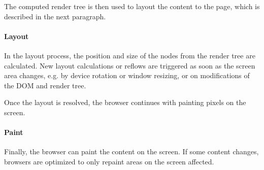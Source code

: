 The computed render tree is then used to layout the content to the page, which is described in the next paragraph.








\paragraph{Layout}



In the layout process, the position and size of the nodes from the render tree are calculated.
New layout calculations or reflows are triggered as soon as the screen area changes, e.g. by device rotation or window resizing, or on modifications of the DOM and render tree. %

Once the layout is resolved, the browser continues with painting pixels on the screen.








\paragraph{Paint}

Finally, the browser can paint the content on the screen.
If some content changes, browsers are optimized to only repaint areas on the screen affected.  %






